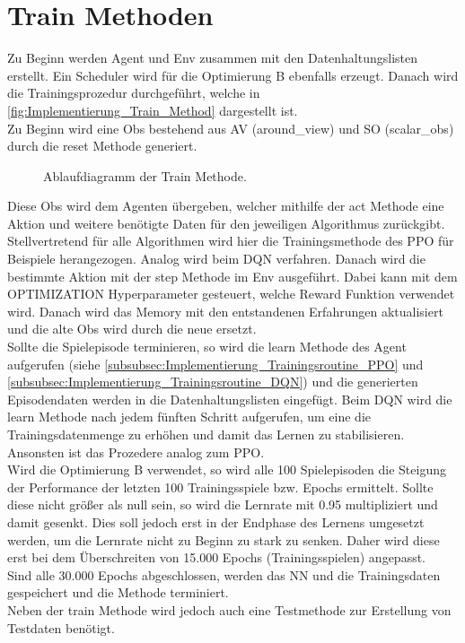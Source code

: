 \section{Train Methoden} \label{sec:Implementierung_train_Methode}
Zu Beginn werden Agent und Env zusammen mit den Datenhaltungslisten  erstellt. Ein Scheduler wird für die Optimierung B  ebenfalls erzeugt. Danach wird die Trainingsprozedur durchgeführt, welche in \autoref{fig:Implementierung_Train_Method} dargestellt ist.\\
Zu Beginn wird eine Obs bestehend aus AV (around\_view) und SO (scalar\_obs) durch die reset Methode  generiert. 
\begin{figure}[H]
	\centering
	
	\caption[Ablaufdiagramm der train Methode]{Ablaufdiagramm der Train Methode.}
	\label{fig:Implementierung_Train_Method}
\end{figure}
Diese Obs wird dem Agenten übergeben, welcher mithilfe der act Methode eine Aktion und weitere benötigte Daten für den jeweiligen Algorithmus zurückgibt.\\
Stellvertretend für alle Algorithmen wird hier die Trainingsmethode des PPO für Beispiele herangezogen. Analog wird beim DQN verfahren.
Danach wird die bestimmte Aktion mit der step Methode  im Env ausgeführt. Dabei kann mit dem OPTIMIZATION Hyperparameter gesteuert, welche Reward Funktion verwendet wird.
Danach wird das Memory mit den entstandenen Erfahrungen aktualisiert und die alte Obs wird durch die neue ersetzt.\\
Sollte die Spielepisode terminieren, so wird die learn Methode des Agent aufgerufen (siehe \autoref{subsubsec:Implementierung_Trainingsroutine_PPO} und \autoref{subsubsec:Implementierung_Trainingsroutine_DQN}) und die generierten Episodendaten werden in die Datenhaltungslisten eingefügt. 
Beim DQN wird die learn Methode nach jedem fünften Schritt aufgerufen, um eine die Trainingsdatenmenge zu erhöhen und damit das Lernen zu stabilisieren. Ansonsten ist das Prozedere analog zum PPO.\\
Wird die Optimierung B verwendet, so wird alle 100 Spielepisoden die Steigung der Performance der letzten 100 Trainingsspiele bzw. Epochs ermittelt. Sollte diese nicht größer als null sein, so wird die Lernrate mit 0.95 multipliziert und damit gesenkt. Dies soll jedoch erst in der Endphase des Lernens umgesetzt werden, um die Lernrate nicht zu Beginn zu stark zu senken. Daher wird diese erst bei dem Überschreiten von 15.000 Epochs (Trainingsspielen) angepasst.\\
Sind alle 30.000 Epochs abgeschlossen, werden das NN und die Trainingsdaten gespeichert und die Methode terminiert.\\
Neben der train Methode wird jedoch auch eine Testmethode zur Erstellung von Testdaten benötigt.

